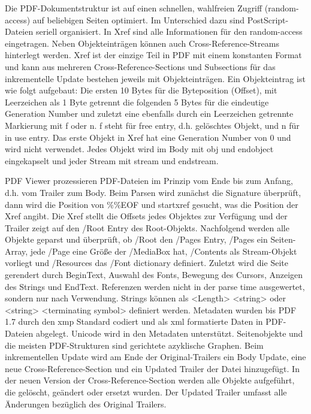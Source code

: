 Die PDF-Dokumentstruktur ist auf einen schnellen, wahlfreien Zugriff (random-access) auf beliebigen Seiten optimiert. Im Unterschied dazu sind PostScript-Dateien seriell organisiert. In Xref sind alle Informationen für den random-access eingetragen. Neben Objekteinträgen können auch Cross-Reference-Streams hinterlegt werden. Xref ist der einzige Teil in PDF mit einem konstanten Format und kann aus mehreren Cross-Reference-Sections und Subsections für das inkrementelle Update bestehen jeweils mit Objekteinträgen. Ein Objekteintrag ist wie folgt aufgebaut: Die ersten 10 Bytes für die Byteposition (Offset), mit Leerzeichen als 1 Byte getrennt die folgenden 5 Bytes für die eindeutige Generation Number und zuletzt eine ebenfalls durch ein Leerzeichen getrennte Markierung mit f oder n. f steht für free entry, d.h. gelöschtes Objekt, und n für in use entry. Das erste Objekt in Xref hat eine Generation Number von 0 und wird nicht verwendet. \cite{ccc-break-pdf} Jedes Objekt wird im Body mit obj und endobject eingekapselt und jeder Stream mit stream und endstream. \cite{schneeberger} 
\par
PDF Viewer prozessieren PDF-Dateien im Prinzip vom Ende bis zum Anfang, d.h. vom Trailer zum Body. \cite{ccc-break-pdf}
Beim Parsen wird zunächst die Signature überprüft, dann wird die Position von \%\%EOF und startxref gesucht, was die Position der Xref angibt. Die Xref stellt die Offsets jedes Objektes zur Verfügung und der Trailer zeigt auf den /Root Entry des Root-Objekts. Nachfolgend werden alle Objekte geparst und überprüft, ob /Root den /Pages Entry, /Pages ein Seiten-Array, jede /Page eine Größe der /MediaBox hat, /Contents als Stream-Objekt vorliegt und /Resources das /Font dictionary definiert. Zuletzt wird die Seite gerendert durch BeginText, Auswahl des Fonts, Bewegung des Cursors, Anzeigen des Strings und EndText. \cite{ccc-pdf-secrets} Referenzen werden nicht in der parse time ausgewertet, sondern nur nach Verwendung. Strings können als <Length> <string> oder <string> <terminating symbol> definiert werden. \cite{ccc-wtf-pdf}
Metadaten wurden bis PDF 1.7 durch den \gls{xmp} Standard codiert und als \gls{xml} formatierte Daten in PDF-Dateien abgelegt.
\cite{softx} 
Unicode wird in den Metadaten unterstützt. Seitenobjekte und die meisten PDF-Strukturen sind gerichtete azyklische Graphen. \cite{ccc-wtf-pdf}
Beim inkrementellen Update wird am Ende der Original-Trailers ein Body Update, eine neue Cross-Reference-Section und ein Updated Trailer der Datei hinzugefügt. In der neuen Version der Cross-Reference-Section werden alle Objekte aufgeführt, die gelöscht, geändert oder ersetzt wurden. Der Updated Trailer umfasst alle Änderungen bezüglich des Original Trailers. \cite{schneeberger}
